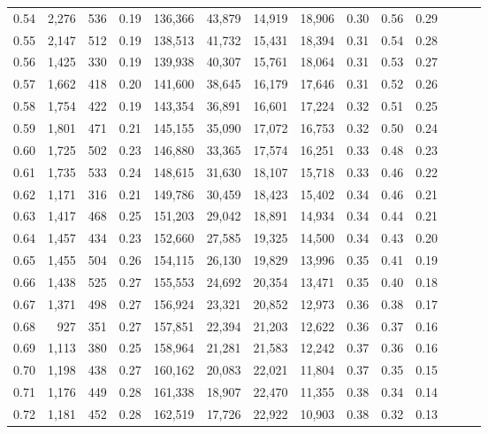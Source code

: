 \begin{tabular}{rrrrrrrrrrrrrr}
0.54 &  2,276 &  536 &  0.19 &  136,366 &   43,879 &  14,919 &  18,906 &  0.30 &  0.56 &      0.29 \\
0.55 &  2,147 &  512 &  0.19 &  138,513 &   41,732 &  15,431 &  18,394 &  0.31 &  0.54 &      0.28 \\
0.56 &  1,425 &  330 &  0.19 &  139,938 &   40,307 &  15,761 &  18,064 &  0.31 &  0.53 &      0.27 \\
0.57 &  1,662 &  418 &  0.20 &  141,600 &   38,645 &  16,179 &  17,646 &  0.31 &  0.52 &      0.26 \\
0.58 &  1,754 &  422 &  0.19 &  143,354 &   36,891 &  16,601 &  17,224 &  0.32 &  0.51 &      0.25 \\
0.59 &  1,801 &  471 &  0.21 &  145,155 &   35,090 &  17,072 &  16,753 &  0.32 &  0.50 &      0.24 \\
0.60 &  1,725 &  502 &  0.23 &  146,880 &   33,365 &  17,574 &  16,251 &  0.33 &  0.48 &      0.23 \\
0.61 &  1,735 &  533 &  0.24 &  148,615 &   31,630 &  18,107 &  15,718 &  0.33 &  0.46 &      0.22 \\
0.62 &  1,171 &  316 &  0.21 &  149,786 &   30,459 &  18,423 &  15,402 &  0.34 &  0.46 &      0.21 \\
0.63 &  1,417 &  468 &  0.25 &  151,203 &   29,042 &  18,891 &  14,934 &  0.34 &  0.44 &      0.21 \\
0.64 &  1,457 &  434 &  0.23 &  152,660 &   27,585 &  19,325 &  14,500 &  0.34 &  0.43 &      0.20 \\
0.65 &  1,455 &  504 &  0.26 &  154,115 &   26,130 &  19,829 &  13,996 &  0.35 &  0.41 &      0.19 \\
0.66 &  1,438 &  525 &  0.27 &  155,553 &   24,692 &  20,354 &  13,471 &  0.35 &  0.40 &      0.18 \\
0.67 &  1,371 &  498 &  0.27 &  156,924 &   23,321 &  20,852 &  12,973 &  0.36 &  0.38 &      0.17 \\
0.68 &    927 &  351 &  0.27 &  157,851 &   22,394 &  21,203 &  12,622 &  0.36 &  0.37 &      0.16 \\
0.69 &  1,113 &  380 &  0.25 &  158,964 &   21,281 &  21,583 &  12,242 &  0.37 &  0.36 &      0.16 \\
0.70 &  1,198 &  438 &  0.27 &  160,162 &   20,083 &  22,021 &  11,804 &  0.37 &  0.35 &      0.15 \\
0.71 &  1,176 &  449 &  0.28 &  161,338 &   18,907 &  22,470 &  11,355 &  0.38 &  0.34 &      0.14 \\
0.72 &  1,181 &  452 &  0.28 &  162,519 &   17,726 &  22,922 &  10,903 &  0.38 &  0.32 &      0.13 \\

\end{tabular}
